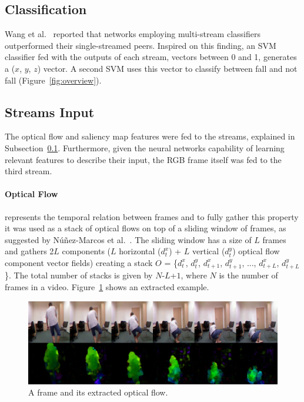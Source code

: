 \documentclass[conference]{IEEEtran}
\begin{document}
\subsection{Classification}
\label{sec:classification}

Wang et al.~\cite{wang2015towards} reported that networks employing multi-stream classifiers outperformed their single-streamed peers. Inspired on this finding, an SVM classifier fed with the outputs of each stream, vectors between 0 and 1, generates a ($x$, $y$, $z$) vector. A second SVM uses this vector to classify between fall and not fall (Figure~\ref{fig:overview}).

\subsection{Streams Input}

The optical flow and saliency map features were fed to the streams, explained in Subsection~\ref{sec:classification}. Furthermore, given the neural networks capability of learning relevant features to describe their input, the RGB frame itself was fed to the third stream.

\paragraph{Optical Flow} represents the temporal relation between frames and to fully gather this property it was used as a stack of optical flows on top of a sliding window of frames, as suggested by N\'u\~nez-Marcos et al.~\cite{nunez2017vision}. The sliding window has a size of $L$ frames and gathers 2$L$ components ($L$ horizontal ($d_t^x$) + $L$ vertical ($d_t^y$) optical flow component vector fields) creating a stack $O$ = \{$d_t^x$, $d_t^y$, $d_{t+1}^x$, $d_{t+1}^y$, ..., $d_{t+L}^x$, $d_{t+L}^y$ \}. The total number of stacks is given by $N$-$L$+$1$, where $N$ is the number of frames in a video. Figure~\ref{fig:of} shows an extracted example.

\begin{figure}[!htb]
\centerline{\includegraphics[width=\linewidth]{figures/of.png}}
\caption{A frame and its extracted optical flow.}
\label{fig:of}
\end{figure}
\end{document}

